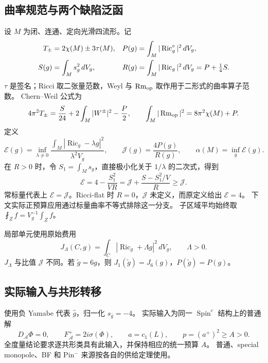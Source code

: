 \documentclass[UTF8,11pt,a4paper,fontset=none]{ctexart}
\numberwithin{equation}{section}
\theoremstyle{definition}
\theoremstyle{remark}\newtheorem{remark}[theorem]{说明}
\newcommand{\Ric}{\operatorname{Ric}}
\newcommand{\Rm}{\operatorname{Rm}}
\newcommand{\Ecal}{\mathcal E}
\newcommand{\Jcal}{\mathcal J}
\newcommand{\avint}{\fint}
\begin{document}
\subsection{曲率规范与两个缺陷泛函}
设 $M$ 为闭、连通、定向光滑四流形。记
\begin{align}
T_\pm&=2\chi(M)\pm3\tau(M),&
P(g)&=\int_M|\Ric_g^\circ|^2\,dV_g,\notag\\
S(g)&=\int_Ms_g^2\,dV_g,&
R(g)&=\int_M|\Ric_g|^2\,dV_g=P+\tfrac14S.
\end{align}
$\tau$ 是签名；Ricci 取二张量范数，Weyl 与 $\Rm_{\rm op}$ 取作用于二形式的曲率算子范数。
Chern--Weil 公式为
\begin{equation}\label{eq:cw}
4\pi^2T_\pm=\frac S{24}+2\int_M|W^\pm|^2-\frac P2,
\qquad
\int_M|\Rm_{\rm op}|^2=8\pi^2\chi(M)+P.
\end{equation}
定义
\begin{equation}\label{eq:defects}
\Ecal(g)=\inf_{\lambda\ne0}
\frac{\int_M|\Ric_g-\lambda g|^2}{\lambda^2V_g},
\qquad \Jcal(g)=\frac{4P(g)}{R(g)},
\qquad \alpha(M)=\inf_g\Ecal(g).
\end{equation}
在 $R>0$ 时，令 $S_1=\int_Ms_g$，直接极小化关于 $1/\lambda$ 的二次式，得到
\begin{equation}\label{eq:Eidentity}
\Ecal=4-\frac{S_1^2}{VR}
=\Jcal+\frac{S-S_1^2/V}{R}\ge\Jcal.
\end{equation}
常标量代表上 $\Ecal=\Jcal$。Ricci-flat 时 $R=0$，$\Jcal$ 未定义，而原定义给出 $\Ecal=4$。
下文实际正预算应用通过标量曲率不等式排除这一分支。
子区域平均始终取 $\avint_Z f=V_g^{-1}\int_Zf$。

局部单元使用原始费用
\begin{equation}
J_\Lambda(C,g)=\int_C|\Ric_g+\Lambda g|^2\,dV_g,
\qquad \Lambda>0.
\end{equation}
$J_\Lambda$ 与比值 $\Jcal$ 不同。若 $\widetilde g=6g$，则 $J_1(\widetilde g)=J_6(g)$，$P(\widetilde g)=P(g)$。

\subsection{实际输入与共形转移}
使用负 Yamabe 代表 $\widehat g$，归一化 $s_{\widehat g}=-4$。
实际输入为同一 $\operatorname{Spin}^c$ 结构上的普通解
\begin{equation}\label{eq:SW}
D_{\mathcal A}\Phi=0,\qquad F_{\mathcal A}^+=2i\sigma(\Phi),
\qquad a=c_1(L),\qquad p=(a^+)^2\ge A>0.
\end{equation}
全度量结论要求逐共形类具有此输入，并保持相应的统一预算 $A$。
普通、special monopole、BF 和 Pin$^-$ 来源按各自的供给定理使用\cite{N1,LeBrunRicci,BF,Pin}。
\end{document}
